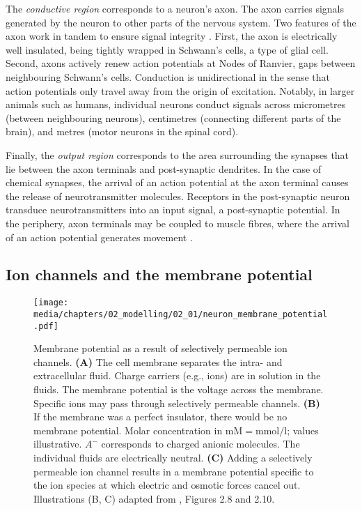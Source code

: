 The \emph{conductive region} corresponds to a neuron's axon.
The axon carries signals generated by the neuron to other parts of the nervous system.
Two features of the axon work in tandem to ensure signal integrity \citep[Chapter~7]{kandel2012principles}.
First, the axon is electrically well insulated, being tightly wrapped in Schwann's cells, a type of glial cell.
Second, axons actively renew action potentials at Nodes of Ranvier, gaps between neighbouring Schwann's cells.
Conduction is unidirectional in the sense that action potentials only travel away from the origin of excitation.
Notably, in larger animals such as humans, individual neurons conduct signals across micrometres (between neighbouring neurons), centimetres (connecting different parts of the brain), and metres (motor neurons in the spinal cord).%

Finally, the \emph{output region} corresponds to the area surrounding the synapses that lie between the axon terminals and post-synaptic dendrites.
In the case of chemical synapses, the arrival of an action potential at the axon terminal causes the release of neurotransmitter molecules.
Receptors in the post-synaptic neuron transduce neurotransmitters into an input signal, a post-synaptic potential.
In the periphery, axon terminals may be coupled to muscle fibres, where the arrival of an action potential generates movement \citep[Chapter~8~\&~9]{kandel2012principles}.

\subsection{Ion channels and the membrane potential}
\label{sec:membrane_potential}

\begin{figure}
	\centering
	{\label{fig:neuron_membrane_potential_membrane}}%
	{\label{fig:neuron_membrane_potential_membrane_isolated}}%
	{\label{fig:neuron_membrane_potential_membrane_channel}}%
	\texttt{[image: media/chapters/02\_modelling/02\_01/neuron\_membrane\_potential.pdf]}
	\caption[Membrane potential as a result of selectively permeable ion channels]{
	Membrane potential as a result of selectively permeable ion channels.
	\textbf{(A)} The cell membrane separates the intra- and extracellular fluid. Charge carriers (e.g., ions) are in solution in the fluids. The membrane potential is the voltage \vMem across the membrane.
	Specific ions may pass through selectively permeable channels.
	\textbf{(B)} If the membrane was a perfect insulator, there would be no membrane potential. Molar concentration in $\mathrm{mM} = \si{\milli\mole\per\litre}$; values illustrative. $A^-$ corresponds to charged anionic molecules.
	The individual fluids are electrically neutral.
	\textbf{(C)} Adding a selectively permeable ion channel results in a membrane potential specific to the ion species at which electric and osmotic forces cancel out.
	Illustrations (B, C) adapted from \citet{reichert2000neurobiologie}, Figures 2.8 and 2.10.}
\end{figure}

